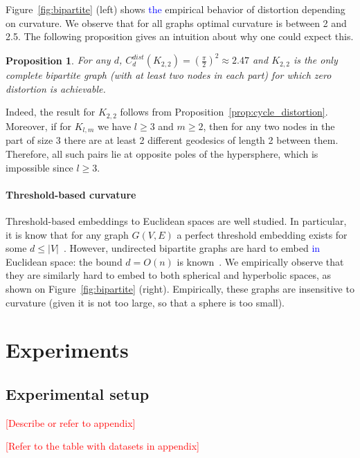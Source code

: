 \documentclass{article} %
\newtheorem{proposition}[theorem]{Proposition}
\newcommand{\ph}[1]{\textcolor{blue}{#1}}
\begin{document}
Figure~\ref{fig:bipartite} (left) shows \ph{the} empirical behavior of distortion depending on curvature. We observe that for all graphs optimal curvature is between 2 and 2.5. 
The following proposition gives an intuition about why one could expect this. 

\begin{proposition}\label{prop:bipartite_distortion}
For any $d$, $C_d^{dist}(K_{2,2}) = \left(\frac{\pi}{2}\right)^2 \approx 2.47$ and $K_{2,2}$ is the only complete bipartite graph (with at least two nodes in each part) for which zero distortion is achievable.
\end{proposition}

Indeed, the result for $K_{2,2}$ follows from Proposition~\ref{prop:cycle_distortion}. Moreover, if for $K_{l,m}$ we have $l \ge 3$ and $m \ge 2$, then for any two nodes in the part of size 3 there are at least 2 different geodesics of length 2 between them. Therefore, all such pairs lie at opposite poles of the hypersphere, which is impossible since $l \ge 3$.

\paragraph{Threshold-based curvature} 
 
Threshold-based embeddings to Euclidean spaces are well studied. In particular, it is know that for any graph $G(V,E)$ a perfect threshold embedding  exists for some $d \le |V|$~\citep{maehara1984space}. 
However, undirected bipartite graphs are hard to embed \ph{in} Euclidean space: the bound $d = O(n)$ is known~\citep{maehara1984space}. We empirically observe that they are similarly hard to embed to both spherical and hyperbolic spaces, as shown on Figure~\ref{fig:bipartite} (right). Empirically, these graphs are insensitive to curvature (given it is not too large, so that a sphere is too small).
 
\section{Experiments}

\subsection{Experimental setup}

\textcolor{red}{[Describe or refer to appendix]}

\textcolor{red}{[Refer to the table with datasets in appendix]}
\end{document}
